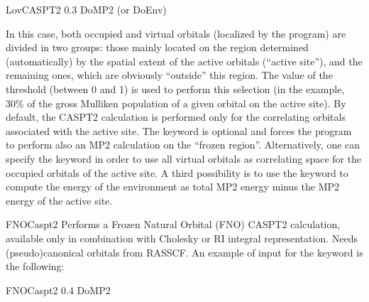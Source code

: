 \begin{keywordlist}
\begin{inputlisting}
LovCASPT2
 0.3
DoMP2  (or DoEnv)

\end{inputlisting}
In this case, both occupied and virtual orbitals (localized by the program) are divided in two groups: those mainly located on
the region determined (automatically) by the spatial extent of the active orbitals (``active site''),
and the remaining ones, which are obviously ``outside'' this region.
The value of the threshold (between 0 and 1) is used to perform this selection
(in the example, 30\% of the gross Mulliken population of a given orbital on the active site).
By default, the CASPT2 calculation is performed only for the correlating orbitals associated with the active site.
The keyword  is optional and forces the program to perform also an MP2 calculation on
the ``frozen region''.
Alternatively, one can specify the keyword  in order to use all virtual orbitals as correlating space for the
occupied orbitals of the active site.
A third possibility is to use the keyword  to compute the energy of the environment as total MP2 energy
minus the MP2 energy of the active site.
\item[FNOCaspt2]
Performs a Frozen Natural Orbital (FNO) CASPT2 calculation, available only in combination with Cholesky or RI integral representation.
Needs (pseudo)canonical orbitals from RASSCF. An example of input for the keyword  is the following:
\begin{inputlisting}

FNOCaspt2
0.4
DoMP2


\end{inputlisting}
\end{keywordlist}

